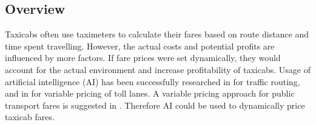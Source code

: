 \subsection{Overview}


Taxicabs often use taximeters to calculate their fares based on route distance
and time spent travelling. However, the actual costs and potential profits are
influenced by more factors. If fare prices were set dynamically, they would
account for the actual environment and increase profitability of taxicabs.
Usage of artificial intelligence (AI) has been successfully researched in
\cite{Tavares2012ai+routing} for traffic routing, and in
\cite{Lou2011ai+highways} for variable pricing of toll lanes. A variable
pricing approach for public transport fares is suggested in
\cite{Emele2013pricing+rural}. Therefore AI could be used to dynamically price
taxicab fares.
